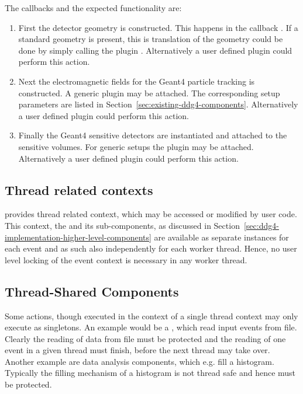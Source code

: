 The callbacks and the expected functionality are:
\begin{enumerate}
\item First the detector geometry is constructed. This happens in the callback
    {}. If a standard \DDhep geometry 
    is present, this is translation of the geometry could be done by simply 
    calling the plugin {}. 
    Alternatively a user defined plugin could perform this action.
\item Next the electromagnetic fields for the Geant4 particle tracking is
    constructed. A generic plugin {}
    may be attached. The corresponding setup parameters are listed in
    Section~\ref{sec:existing-ddg4-components}. 
    Alternatively a user defined plugin could perform this action.
\item Finally the Geant4 sensitive detectors are instantiated and attached 
    to the sensitive volumes. For generic setups the plugin
    {} may be attached.
    Alternatively a user defined plugin could perform this action.
\end{enumerate}

\subsection{Thread related contexts}
\label{sec:ddg4-thread-save context}
\noindent
\DDG provides thread related context, which may be accessed or modified
by user code. This context, the {} and its sub-components,
as discussed in Section~\ref{sec:ddg4-implementation-higher-level-components}
are available as separate instances for each event and as such
also independently for each worker thread. Hence, no user level locking of the 
event context is necessary in any worker thread.

\subsection{Thread-Shared Components}
\label{sec:ddg4-multi-threaded-shared-actions}
\noindent
Some actions, though executed in the context of a single thread context 
may only execute as singletons. An example would be a {},
which read input events from file. Clearly the reading of data from
file must be protected and the reading of one event in a given thread
must finish, before the next thread may take over.
Another example are data analysis components, which e.g. fill a histogram.
Typically the filling mechanism of a histogram is not thread safe and hence must
be protected.


